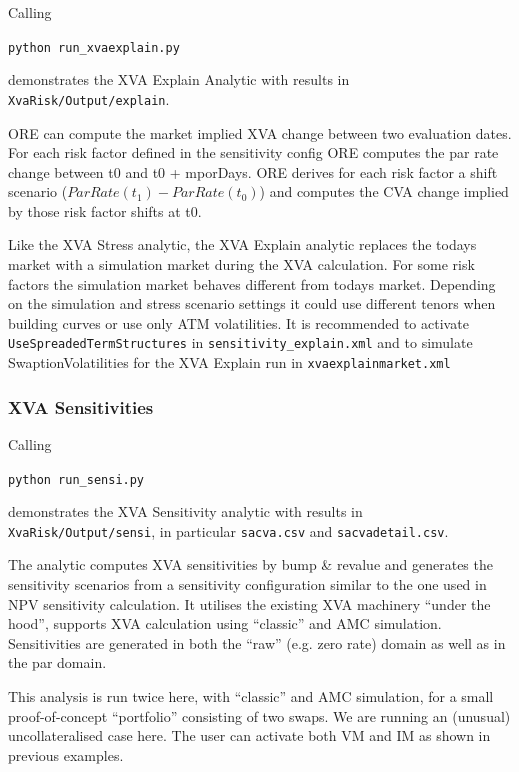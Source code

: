 Calling

\medskip
\centerline {\tt python run\_xvaexplain.py} 

\medskip
demonstrates the XVA Explain Analytic with results in {\tt XvaRisk/Output/explain}.

ORE can compute the market implied XVA change between two evaluation dates.
For each risk factor defined in the sensitivity config ORE computes the par rate change between t0
and t0 + mporDays.  ORE derives for each risk factor a shift scenario ($ParRate(t_1) - ParRate(t_0)$)
and computes the CVA change implied by those risk factor shifts at t0.

Like the XVA Stress analytic,
the XVA Explain analytic replaces the todays market with a simulation market during the XVA calculation.
For some risk factors the simulation market behaves different from todays market.
Depending on the simulation and stress scenario settings it could use different tenors when building curves 
or use only ATM volatilities. It is recommended to activate {\tt UseSpreadedTermStructures} in
{\tt sensitivity\_explain.xml} and to simulate SwaptionVolatilities for the XVA Explain run
in {\tt xvaexplainmarket.xml}

\subsubsection{XVA Sensitivities}\label{example:xvarisk_sensi}

Calling

\medskip
\centerline {\tt python run\_sensi.py} 

\medskip
demonstrates the XVA Sensitivity analytic with results in {\tt XvaRisk/Output/sensi}, in particular
{\tt sacva.csv} and {\tt sacvadetail.csv}.

The analytic computes XVA sensitivities by bump \& revalue and generates the sensitivity scenarios from a
sensitivity configuration similar to the one used in NPV sensitivity calculation. It utilises the existing
XVA machinery ``under the hood'', supports XVA calculation using ``classic'' and AMC simulation.
Sensitivities are generated in both the ``raw'' (e.g. zero rate) domain as well as in the par domain.

This analysis is run twice here, with ``classic'' and AMC simulation, for a small proof-of-concept
``portfolio'' consisting of two swaps. We are running an (unusual) uncollateralised case here. The user
can activate both VM and IM as shown in previous examples.

